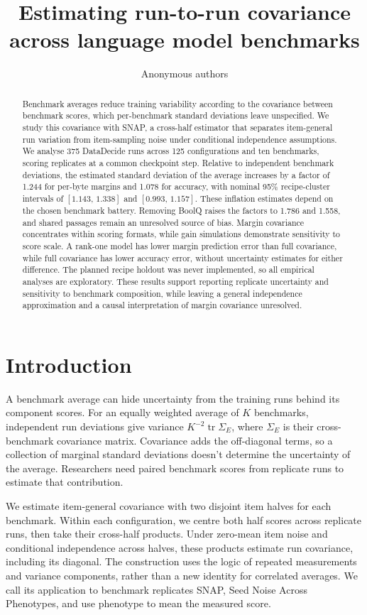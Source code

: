 \documentclass{article}
\title{Estimating run-to-run covariance\\across language model benchmarks}
\author{Anonymous authors}
\newcommand{\ci}[2]{\ensuremath{[#1,\,#2]}}
\newcommand{\Sig}{\Sigma_E}
\begin{document}
\maketitle
\begin{abstract}
Benchmark averages reduce training variability according to the covariance between benchmark scores, which per-benchmark standard deviations leave unspecified. We study this covariance with SNAP, a cross-half estimator that separates item-general run variation from item-sampling noise under conditional independence assumptions. We analyse 375 DataDecide runs across 125 configurations and ten benchmarks, scoring replicates at a common checkpoint step. Relative to independent benchmark deviations, the estimated standard deviation of the average increases by a factor of 1.244 for per-byte margins and 1.078 for accuracy, with nominal 95\% recipe-cluster intervals of \ci{1.143}{1.338} and \ci{0.993}{1.157}. These inflation estimates depend on the chosen benchmark battery. Removing BoolQ raises the factors to 1.786 and 1.558, and shared passages remain an unresolved source of bias. Margin covariance concentrates within scoring formats, while gain simulations demonstrate sensitivity to score scale. A rank-one model has lower margin prediction error than full covariance, while full covariance has lower accuracy error, without uncertainty estimates for either difference. The planned recipe holdout was never implemented, so all empirical analyses are exploratory. These results support reporting replicate uncertainty and sensitivity to benchmark composition, while leaving a general independence approximation and a causal interpretation of margin covariance unresolved.
\end{abstract}

\section{Introduction}
A benchmark average can hide uncertainty from the training runs behind its component scores. For an equally weighted average of $K$ benchmarks, independent run deviations give variance $K^{-2}\operatorname{tr}\Sig$, where $\Sig$ is their cross-benchmark covariance matrix. Covariance adds the off-diagonal terms, so a collection of marginal standard deviations doesn't determine the uncertainty of the average. Researchers need paired benchmark scores from replicate runs to estimate that contribution.

We estimate item-general covariance with two disjoint item halves for each benchmark. Within each configuration, we centre both half scores across replicate runs, then take their cross-half products. Under zero-mean item noise and conditional independence across halves, these products estimate run covariance, including its diagonal. The construction uses the logic of repeated measurements and variance components, rather than a new identity for correlated averages. We call its application to benchmark replicates SNAP, Seed Noise Across Phenotypes, and use phenotype to mean the measured score.
\end{document}
